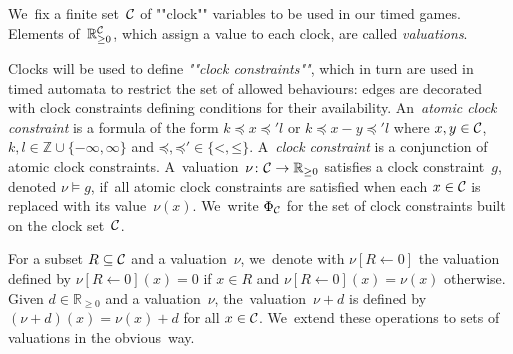 We~fix a finite set~$\mathcal{C}$ of ""clock"" variables to be used
in our timed games. Elements of~$\mathbb{R}_{\geq 0}^{\mathcal{C}}$, which assign a
value to each clock, are called \emph{valuations}.

Clocks will be used to define \emph{""clock constraints""}, which in turn
are used in timed automata to restrict the set of allowed behaviours:
edges are decorated with clock constraints defining conditions for
their availability.
An~\emph{atomic clock constraint} is a formula of the form $k \preceq
x \preceq' l$ or $k \preceq x - y \preceq' l$ where $x,y \in \mathcal{C}$,
$k,l \in \mathbb{Z}\cup\{-\infty,\infty\}$ and
${\mathord\preceq,\mathord\preceq' \in
  \{\mathord<,\mathord\leq\}}$. A~\emph{clock constraint} is a
conjunction of atomic clock constraints.  A~valuation~$\nu\colon
\mathcal{C}\to\mathbb{R}_{\geq 0}$ satisfies a clock constraint~$g$, denoted $\nu \models g$,
if~all atomic clock constraints are satisfied when each $x\in \mathcal{C}$
is replaced with its value~$\nu(x)$.  We~write $\Phi_{\mathcal{C}}$ for the
set of clock constraints built on the clock set~$\mathcal{C}$.



For a subset $R\subseteq \mathcal{C}$ and a valuation~$\nu$, we~denote
with ${\nu[R \leftarrow 0]}$ the valuation defined by ${\nu[R
    \leftarrow 0](x) = 0}$ if $x \in R$ and ${\nu[R\leftarrow 0](x) =
  \nu(x)}$ otherwise. Given $d \in \mathbb{R}_{\geq 0}$ and a
valuation~$\nu$, the~valuation~$\nu+d$ is defined by $(\nu+d)(x) =
\nu(x)+d$ for all $x\in \mathcal{C}$. We~extend these operations to sets
of valuations in the obvious~way.


%


